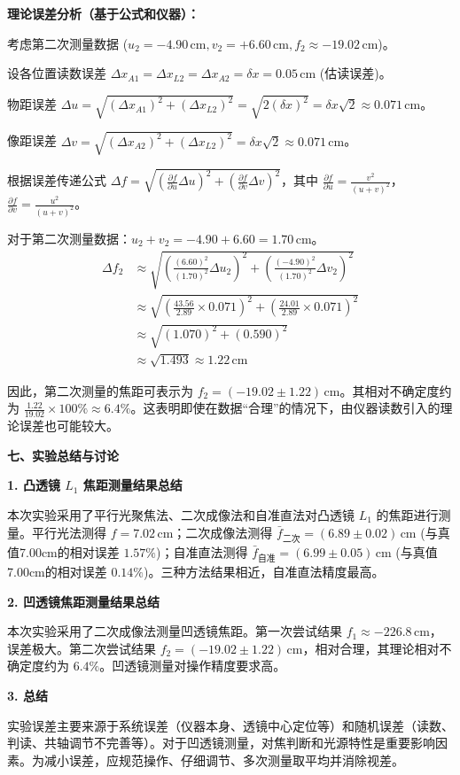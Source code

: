 ﻿\documentclass[12pt,a4paper]{article}
\newcommand{\rmcm}{\mathrm{\,cm}}
\begin{document}
\par \textbf{理论误差分析（基于公式和仪器）：}
\par 考虑第二次测量数据 ($u_2 = -4.90 \rmcm, v_2 = +6.60 \rmcm, f_2 \approx -19.02 \rmcm$)。
\par 设各位置读数误差 $\Delta x_{A1} = \Delta x_{L2} = \Delta x_{A2} = \delta x = 0.05 \rmcm$ (估读误差)。
\par 物距误差 $\Delta u = \sqrt{(\Delta x_{A1})^2 + (\Delta x_{L2})^2} = \sqrt{2 (\delta x)^2} = \delta x \sqrt{2} \approx 0.071 \rmcm$。
\par 像距误差 $\Delta v = \sqrt{(\Delta x_{A2})^2 + (\Delta x_{L2})^2} = \delta x \sqrt{2} \approx 0.071 \rmcm$。
\par 根据误差传递公式 $\Delta f = \sqrt{ \left(\frac{\partial f}{\partial u} \Delta u\right)^2 + \left(\frac{\partial f}{\partial v} \Delta v\right)^2 }$，其中 $\frac{\partial f}{\partial u} = \frac{v^2}{(u+v)^2}$，$\frac{\partial f}{\partial v} = \frac{u^2}{(u+v)^2}$。
\par 对于第二次测量数据：$u_2+v_2 = -4.90+6.60 = 1.70 \rmcm$。
\begin{equation*}
\begin{split}
\Delta f_2 &\approx \sqrt{ \left(\frac{(6.60)^2}{(1.70)^2} \Delta u_2\right)^2 + \left(\frac{(-4.90)^2}{(1.70)^2} \Delta v_2\right)^2 } \\
    &\approx \sqrt{ \left(\frac{43.56}{2.89} \times 0.071\right)^2 + \left(\frac{24.01}{2.89} \times 0.071\right)^2 } \\
    &\approx \sqrt{ (1.070)^2 + (0.590)^2 } \\
    &\approx \sqrt{ 1.493 } \approx 1.22 \rmcm
\end{split}
\end{equation*}
\par 因此，第二次测量的焦距可表示为 $f_2 = (-19.02 \pm 1.22) \rmcm$。其相对不确定度约为 $\frac{1.22}{19.02} \times 100\% \approx 6.4\%$。这表明即使在数据“合理”的情况下，由仪器读数引入的理论误差也可能较大。

\vspace{0.5cm}
\noindent\textbf{七、实验总结与讨论}

\noindent\textbf{1. 凸透镜 $L_1$ 焦距测量结果总结}

本次实验采用了平行光聚焦法、二次成像法和自准直法对凸透镜 $L_1$ 的焦距进行测量。平行光法测得 $f = 7.02 \rmcm$；二次成像法测得 $\bar{f}_{\text{二次}} = (6.89 \pm 0.02) \rmcm$ (与真值7.00cm的相对误差 $1.57\%$)；自准直法测得 $\bar{f}_{\text{自准}} = (6.99 \pm 0.05) \rmcm$ (与真值7.00cm的相对误差 $0.14\%$)。三种方法结果相近，自准直法精度最高。

\noindent\textbf{2. 凹透镜焦距测量结果总结}

本次实验采用了二次成像法测量凹透镜焦距。第一次尝试结果 $f_1 \approx -226.8 \rmcm$，误差极大。第二次尝试结果 $f_2 = (-19.02 \pm 1.22) \rmcm$，相对合理，其理论相对不确定度约为 $6.4\%$。凹透镜测量对操作精度要求高。

\noindent\textbf{3. 总结}

实验误差主要来源于系统误差（仪器本身、透镜中心定位等）和随机误差（读数、判读、共轴调节不完善等）。对于凹透镜测量，对焦判断和光源特性是重要影响因素。为减小误差，应规范操作、仔细调节、多次测量取平均并消除视差。
\end{document}
